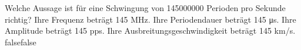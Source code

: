     {Welche Aussage ist für eine Schwingung von 145000000 Perioden pro Sekunde richtig?}
    {Ihre Frequenz beträgt 145 MHz.}
    {Ihre Periodendauer beträgt 145 μs.}
    {Ihre Amplitude beträgt 145 pps.}
    {Ihre Ausbreitungsgeschwindigkeit beträgt 145 km/s.}
    {false}{false}